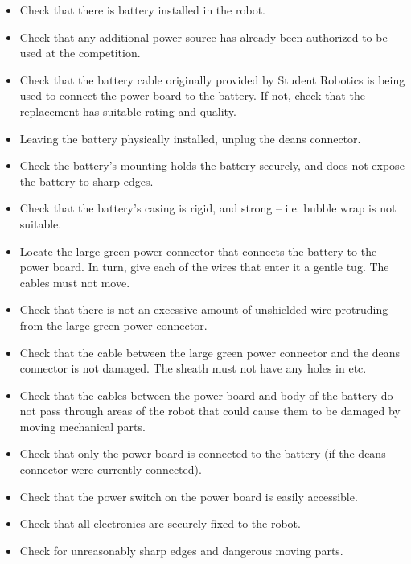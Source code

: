 \begin{itemize}
\item Check that there is battery installed in the robot.
\item Check that any additional power source has already been authorized to be used at the competition.
\item Check that the battery cable originally provided by Student Robotics is being used to connect the power board to the battery. If not, check that the replacement has suitable rating and quality.
\item Leaving the battery physically installed, unplug the deans connector.
\item Check the battery's mounting holds the battery securely, and does not expose the battery to sharp edges.
\item Check that the battery's casing is rigid, and strong -- i.e. bubble wrap is not suitable.
\item Locate the large green power connector that connects the battery to the power board. In turn, give each of the wires that enter it a gentle tug. The cables must not move.
\item Check that there is not an excessive amount of unshielded wire protruding from the large green power connector.
\item Check that the cable between the large green power connector and the deans connector is not damaged. The sheath must not have any holes in etc.
\item Check that the cables between the power board and body of the battery do not pass through areas of the robot that could cause them to be damaged by moving mechanical parts.
\item Check that only the power board is connected to the battery (if the deans connector were currently connected).
\item Check that the power switch on the power board is easily accessible.
\item Check that all electronics are securely fixed to the robot.
\item Check for unreasonably sharp edges and dangerous moving parts.
\end{itemize}
